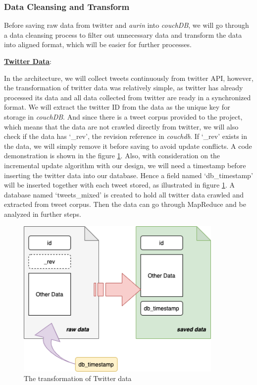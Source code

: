 \documentclass{article}
\begin{document}
\subsubsection{Data Cleansing and Transform}
Before saving raw data from twitter and \textit{aurin} into \textit{couchDB}, we will go through a data cleansing process to filter out unnecessary data and transform the data into aligned format, which will be easier for further processes. 

\textbf{\underline{Twitter Data}}: 

In the architecture, we will collect tweets continuously from twitter API, however, the transformation of twitter data was relatively simple, as twitter has already processed its data and all data collected from twitter are ready in a synchronized format. We will extract the twitter ID from the data as the unique key for storage in \textit{couchDB}. And since there is a tweet corpus provided to the project, which means that the data are not crawled directly from twitter, we will also check if the data has ‘\_rev’, the revision reference in \textit{couchdb}. If ‘\_rev’ exists in the data, we will simply remove it before saving to avoid update conflicts. A code demonstration is shown in the figure \ref{fig:twitterdata}.
Also, with consideration on the incremental update algorithm with our design, we will need a timestamp before inserting the twitter data into our database. Hence a field named ‘db\_timestamp’ will be inserted together with each tweet stored, as illustrated in figure \ref{fig:twitterdata}. A database named ‘tweets\_mixed’ is created to hold all twitter data crawled and extracted from tweet corpus. Then the data can go through MapReduce and be analyzed in further steps.
\begin{figure}
\centering
\includegraphics[width=10cm]{img/twitterdata.png}
\caption{The transformation of Twitter data}
\label{fig:twitterdata}
\end{figure}
\end{document}

